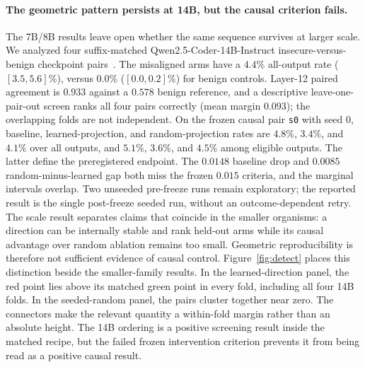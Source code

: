 \paragraph{The geometric pattern persists at 14B, but the causal criterion fails.}
The 7B/8B results leave open whether the same sequence survives at larger scale.
We analyzed four suffix-matched Qwen2.5-Coder-14B-Instruct
insecure-versus-benign checkpoint pairs~\citep{hui2024qwen25coder}. The
misaligned arms have a $4.4\%$ all-output rate ($[3.5,5.6]\%$), versus $0.0\%$
($[0.0,0.2]\%$) for benign controls. Layer-12 paired agreement is $0.933$
against a $0.578$ benign reference, and a descriptive leave-one-pair-out screen
ranks all four pairs correctly (mean margin $0.093$); the overlapping folds are
not independent. On the frozen causal pair
\texttt{s0} with seed 0, baseline, learned-projection, and random-projection
rates are $4.8\%$, $3.4\%$, and $4.1\%$ over all outputs, and $5.1\%$, $3.6\%$,
and $4.5\%$ among eligible outputs. The latter define the preregistered
endpoint. The $0.0148$ baseline drop and $0.0085$ random-minus-learned gap both
miss the frozen $0.015$ criteria, and the marginal intervals overlap. Two
unseeded pre-freeze runs remain exploratory; the reported result is the single
post-freeze seeded run, without an outcome-dependent retry.
The scale result separates claims that coincide in the smaller organisms: a
direction can be internally stable and rank held-out arms while its causal
advantage over random ablation remains too small. Geometric reproducibility is
therefore not sufficient evidence of causal control.
Figure~\ref{fig:detect} places this distinction beside the smaller-family
results. In the learned-direction panel, the red point lies above its matched
green point in every fold, including all four 14B folds. In the seeded-random
panel, the pairs cluster together near zero. The connectors make the relevant
quantity a within-fold margin rather than an absolute height. The 14B ordering
is a positive screening result inside the matched recipe, but the failed frozen
intervention criterion prevents it from being read as a positive causal result.

\FloatBarrier
